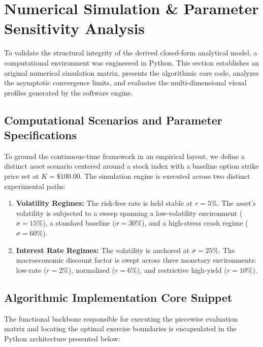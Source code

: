 \documentclass[12pt]{article}
\theoremstyle{definition}
\numberwithin{equation}{section}
\begin{document}
\section{Numerical Simulation \& Parameter Sensitivity Analysis}

To validate the structural integrity of the derived closed-form analytical model, a computational environment was engineered in Python. This section establishes an original numerical simulation matrix, presents the algorithmic core code, analyzes the asymptotic convergence limits, and evaluates the multi-dimensional visual profiles generated by the software engine.

\subsection{Computational Scenarios and Parameter Specifications}
To ground the continuous-time framework in an empirical layout, we define a distinct asset scenario centered around a stock index with a baseline option strike price set at $K = \$100.00$. The simulation engine is executed across two distinct experimental paths:
\begin{enumerate}
    \item \textbf{Volatility Regimes:} The risk-free rate is held stable at $r = 5\%$. The asset's volatility is subjected to a sweep spanning a low-volatility environment ($\sigma = 15\%$), a standard baseline ($\sigma = 30\%$), and a high-stress crash regime ($\sigma = 60\%$). 
    \item \textbf{Interest Rate Regimes:} The volatility is anchored at $\sigma = 25\%$. The macroeconomic discount factor is swept across three monetary environments: low-rate ($r = 2\%$), normalized ($r = 6\%$), and restrictive high-yield ($r = 10\%$).
\end{enumerate}

\subsection{Algorithmic Implementation Core Snippet}
The functional backbone responsible for executing the piecewise evaluation matrix and locating the optimal exercise boundaries is encapsulated in the Python architecture presented below:
\end{document}
